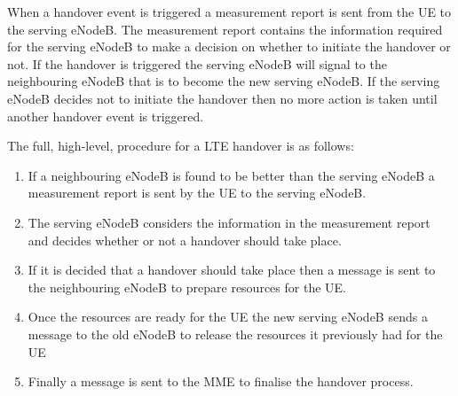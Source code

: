 When a handover event is triggered a measurement report is sent from the UE to the serving eNodeB. The measurement report contains the information required for the serving eNodeB to make a decision on whether to initiate the handover or not. If the handover is triggered the serving eNodeB will signal to the neighbouring eNodeB that is to become the new serving eNodeB. If the serving eNodeB decides not to initiate the handover then no more action is taken until another handover event is triggered.

The full, high-level, procedure for a LTE handover is as follows:
\begin{enumerate}
	\item If a neighbouring eNodeB is found to be better than the serving eNodeB a measurement report is sent by the UE to the serving eNodeB.
	\item The serving eNodeB considers the information in the measurement report and decides whether or not a handover should take place.
	\item If it is decided that a handover should take place then a message is sent to the neighbouring eNodeB to prepare resources for the UE.
	\item Once the resources are ready for the UE the new serving eNodeB sends a message to the old eNodeB to release the resources it previously had for the UE
	\item Finally a message is sent to the MME to finalise the handover process.
\end{enumerate}
